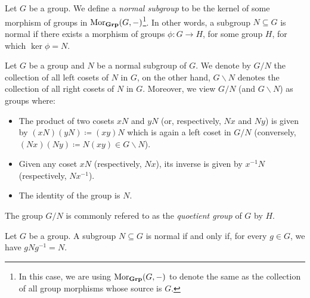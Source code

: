 \begin{definition}
\label{def:normal-subgroup}
Let \(G\) be a group. We define a \emph{normal subgroup} to be the kernel of
some morphism of groups in \(\operatorname{Mor}_{{\textbf{Grp}}}(G, -)\)\footnote{In this case, we are
using \(\operatorname{Mor}_{{\textbf{Grp}}}(G, -)\) to denote the same as the collection of all group
morphisms whose source is \(G\).}. In other words, a subgroup \(N \subseteq G\)
is normal if there exists a morphism of groups \(\phi: G \to H\), for some group
\(H\), for which \(\ker \phi = N\).
\end{definition}

\begin{definition}
\label{def:quotient-group}
Let \(G\) be a group and \(N\) be a normal subgroup of \(G\). We denote by
\(G/N\) the collection of all left cosets of \(N\) in \(G\), on the other hand,
\(G \backslash N\) denotes the collection of all right cosets of \(N\) in
\(G\). Moreover, we view \(G/N\) (and \(G \backslash N\)) as groups where:
\begin{itemize}\setlength\itemsep{0em}
\item The product of two cosets \(x N\) and \(y N\) (or, respectively, \(N
  x\) and \(N y\)) is given by \((x N) (y N) \coloneq (x y) N\) which is again a
  left coset in \(G/N\) (conversely, \((N x) (N y) \coloneq N (x y) \in G
  \backslash N\)).
\item Given any coset \(x N\) (respectively, \(N x\)), its inverse is given by
  \(x^{-1} N\) (respectively, \(N x^{-1}\)).
\item The identity of the group is \(N\).
\end{itemize}
The group \(G/N\) is commonly refered to as the \emph{quoetient group} of \(G\)
by \(H\).
\end{definition}

\begin{proposition}
\label{prop:normal-subgroup-equivalence}
Let \(G\) be a group. A subgroup \(N \subseteq G\) is normal if and only if, for
every \(g \in G\), we have \(gNg^{-1} = N\).
\end{proposition}

